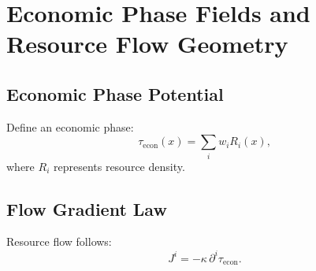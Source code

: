 \chapter{Economic Phase Fields and Resource Flow Geometry}

\section{Economic Phase Potential}
Define an economic phase:
\[
\tau_{\mathrm{econ}}(x) = \sum_i w_i R_i(x),
\]
where \(R_i\) represents resource density.

\section{Flow Gradient Law}
Resource flow follows:
\[
J^i = -\kappa\,\partial^i\tau_{\mathrm{econ}}.
\]

